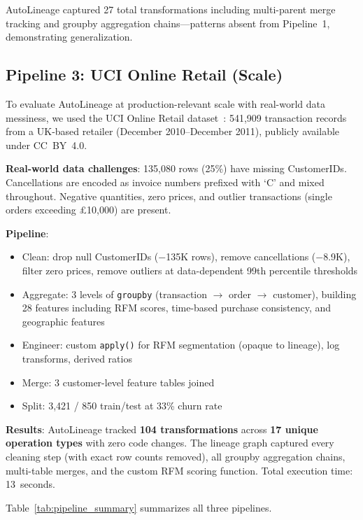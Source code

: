 \documentclass[10pt,twocolumn]{article}
\begin{document}
AutoLineage captured 27 total transformations including multi-parent merge tracking and groupby aggregation chains---patterns absent from Pipeline~1, demonstrating generalization.

\subsection{Pipeline 3: UCI Online Retail (Scale)}
\label{sec:pipeline3}

To evaluate AutoLineage at production-relevant scale with real-world data messiness, we used the UCI Online Retail dataset~\cite{chen2015}: 541,909 transaction records from a UK-based retailer (December 2010--December 2011), publicly available under CC~BY~4.0.

\textbf{Real-world data challenges}: 135,080 rows (25\%) have missing CustomerIDs. Cancellations are encoded as invoice numbers prefixed with `C' and mixed throughout. Negative quantities, zero prices, and outlier transactions (single orders exceeding \pounds10,000) are present.

\textbf{Pipeline}:
\begin{itemize}[leftmargin=*, nosep]
  \item Clean: drop null CustomerIDs ($-$135K rows), remove cancellations ($-$8.9K), filter zero prices, remove outliers at data-dependent 99th percentile thresholds
  \item Aggregate: 3 levels of \texttt{groupby} (transaction $\to$ order $\to$ customer), building 28 features including RFM scores, time-based purchase consistency, and geographic features
  \item Engineer: custom \texttt{apply()} for RFM segmentation (opaque to lineage), log transforms, derived ratios
  \item Merge: 3 customer-level feature tables joined
  \item Split: 3,421 / 850 train/test at 33\% churn rate
\end{itemize}

\textbf{Results}: AutoLineage tracked \textbf{104 transformations} across \textbf{17 unique operation types} with zero code changes. The lineage graph captured every cleaning step (with exact row counts removed), all groupby aggregation chains, multi-table merges, and the custom RFM scoring function. Total execution time: 13~seconds.

Table~\ref{tab:pipeline_summary} summarizes all three pipelines.
\end{document}
